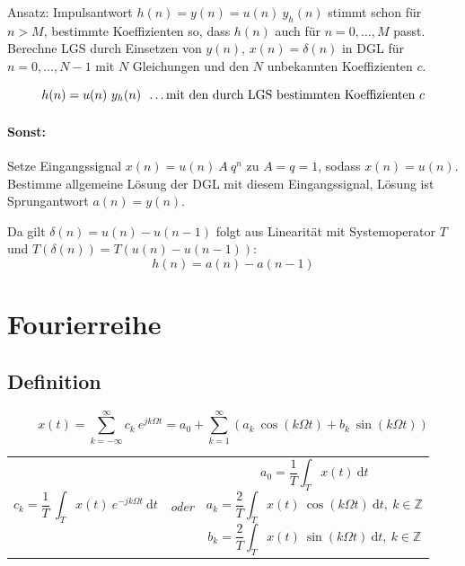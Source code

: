 \documentclass[10pt,a4paper]{article}
\newcommand{\fancythumb}[2]{
	\addthumb{#1}{\large\sffamily\textbf{\space\space#1\vspace{5pt}}}{white}{#2}
}
\begin{document}
\vspace{.5em}
Ansatz: Impulsantwort $h(n) = y(n) = u(n) ~ y_h(n)$ stimmt schon für $n > M$, bestimmte Koeffizienten so, dass $h(n)$ auch für $n = 0, …, M$ passt. Berechne LGS durch Einsetzen von $y(n)$, $x(n) = \delta(n)$ in DGL für $n = 0, …, N - 1$ mit $N$ Gleichungen und den $N$ unbekannten Koeffizienten $c$.

\[
	h(n) = u(n) ~ y_h(n) ~~ \textnormal{…mit den durch LGS bestimmten Koeffizienten $c$}
\]

\paragraph{Sonst:} Setze Eingangssignal $x(n) = u(n) ~ A ~ q^n$ zu $A = q = 1$, sodass $x(n) = u(n)$. Bestimme allgemeine Lösung der DGL mit diesem Eingangssignal, Lösung ist Sprungantwort $a(n) = y(n)$.

\vspace{.5em}
Da gilt $\delta(n) = u(n) - u(n - 1)$ folgt aus Linearität mit Systemoperator $T$ und $T(\delta(n)) = T(u(n) - u(n - 1))$:
\[
	h(n) = a(n) - a(n-1)
\]

\newpage

\section*{Fourierreihe}
\fancythumb{FR}{blue}
\subsection*{Definition}
\[
	x(t) = \sum_{k=-\infty}^\infty c_k ~ e^{jk\Omega t} = a_0 + \sum_{k=1}^\infty \left( a_k ~ \cos(k \Omega t) + b_k ~ \sin(k \Omega t) \right)
\]

\begin{centering}
\begin{tabular}{ >{\centering\arraybackslash} m{7cm} >{\centering\arraybackslash} m{1cm} >{\centering\arraybackslash} m{7cm} }

\[
	c_k = \frac{1}{T} ~ \int_T x(t) ~ e^{-jk\Omega t} ~ \mathrm dt
\] & \textit{\sffamily oder} & {
\[
	a_0 = \frac{1}{T} \int_T x(t) ~ \mathrm dt
\]
\[
	a_k = \frac{2}{T} \int_T x(t) ~ \cos(k\Omega t) ~ \mathrm dt, ~ k \in \mathbb Z
\]
\[
	b_k = \frac{2}{T} \int_T x(t) ~ \sin(k\Omega t) ~ \mathrm dt, ~ k \in \mathbb Z
\]
}\\
\end{tabular}
\end{centering}
\end{document}
